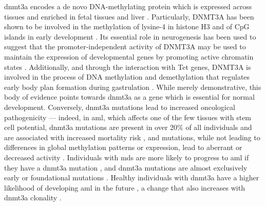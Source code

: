 \Ac{dnmt3a} encodes a de novo DNA-methylating protein \cite{Yanagisawa2002-op} which is expressed across tissues and enriched in fetal tissues and liver \cite{Robertson1999-dp}. Particularly, DNMT3A has been shown to be involved in the methylation of lysine-4 in histone H3 \cite{Ooi2007-pu} and of CpG islands in early development \cite{Smallwood2011-to}. Its essential role in neurogenesis has been used to suggest that the promoter-independent activity of DNMT3A may be used to maintain the expression of developmental genes by promoting active chromatin states \cite{Wu2010-ig}. Additionally, and through the interaction with Tet genes, DNMT3A is involved in the process of DNA methylation and demethylation that regulates early body plan formation during gastrulation \cite{Dai2016-kl}. While merely demonstrative, this body of evidence points towards \ac{dnmt3a} as a gene which is essential for normal development. Conversely, \ac{dnmt3a} mutations lead to increased oncological pathogenicity --- indeed, in \ac{aml}, which affects one of the few tissues with stem cell potential, \ac{dnmt3a} mutations are present in over 20\% of all individuals and are associated with increased mortality risk \cite{Ley2010-yk}, and mutations, while not leading to differences in global methylation patterns or expression, lead to aberrant or decreased activity \cite{Yan2011-ug}. Individuals with \ac{mds} are more likely to progress to \ac{aml} if they have a \ac{dnmt3a} mutation \cite{Walter2011-ua}, and \ac{dnmt3a} mutations are almost exclusively early or foundational mutations \cite{Shlush2014-di,Miller2013-cw}. Healthy individuals with \ac{dnmt3a} have a higher likelihood of developing \ac{aml} in the future \cite{Gerstung2017-bm,Abelson2018-wh}, a change that also increases with \ac{dnmt3a} clonality \cite{Desai2018-pj}. 

